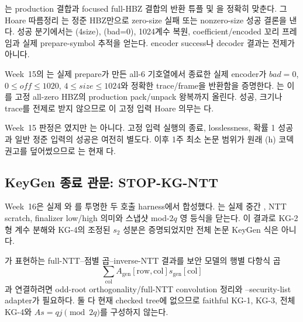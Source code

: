 는 production 결합과
focused full-HBZ 결합의 반환 튜플 및 을 정확히
맞춘다. 그 Hoare 따름정리
는 정준 HBZ만으로
zero-size 실패 또는 nonzero-size 성공 결론을 낸다. 성공 분기에서는
(4\le size), (bad=0), 1024계수 복원, coefficient/encoded 꼬리
프레임과 실제 prepare-symbol 추적을 얻는다. encoder success나 decoder 결과는
전제가 아니다.

\begin{verified}
Week~15의 는 실제 prepare가
만든 all-6 기호열에서 종료한 실제 encoder가 \(bad=0\), \(0\le off\le1020\),
\(4\le size\le1024\)와 정확한 trace/frame을 반환함을 증명한다.
는 이를 고정
all-zero HBZ의 production pack/unpack 왕복까지 올린다. 성공, 크기나 trace를
전제로 받지 않으므로 이 고정 입력 Hoare 의무는 \statusproved 다.
\end{verified}

Week~15 판정은 였지만
는 아니다. 고정 입력 실행의 종료,
losslessness, 확률 1 성공과 일반 정준 입력의 성공은 여전히 별도다. 이후
1주 최소 논문 범위가 원래 (h) 코덱 권고를 덮어썼으므로
는 현재 \statusdeferred 다.

\subsection{KeyGen 종료 관문: STOP-KG-NTT}

Week~16은 실제 와
를 투명한 두 호출 harness에서 합성했다.
는 실제 중간
, NTT scratch, finalizer low/high 의미와 스냅샷
mod-\(2q\) 영 등식을 닫는다. 이 결과로 KG-2형 계수 분해와 KG-4의 조정된
\(s_2\) 성분은 증명되었지만 전체 논문 KeyGen 식은 아니다.

\begin{boundary}
가 표현하는
full-NTT--점별 곱--inverse-NTT 결과를 보안 모델의 행별 다항식 곱
\[
  \sum_{\mathrm{col}}
  A_{\mathrm{gen}}[\mathrm{row},\mathrm{col}]
  s_{\mathrm{gen}}[\mathrm{col}]
\]
과 연결하려면 odd-root orthogonality/full-NTT convolution 정리와
--security-list adapter가 필요하다. 둘 다 현재 checked
tree에 없으므로 faithful KG-1, KG-3, 전체 KG-4와
\(As=qj\pmod{2q}\)를 구성하지 않는다.
\end{boundary}

